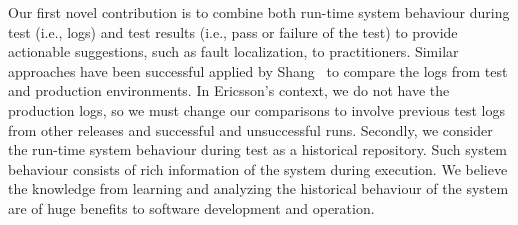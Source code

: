 Our first novel contribution is to combine both run-time system behaviour during test (i.e., logs) and test results (i.e., pass or failure of the test) to provide actionable suggestions, such as fault localization, to practitioners. Similar approaches have been successful applied by Shang~\cite{Shang:2013:ADB:2486788.2486842} to compare the logs from test and production environments. In Ericsson's context, we do not have the production logs, so we must change our comparisons to involve previous test logs from other releases and successful and unsuccessful runs. Secondly, we consider the run-time system behaviour during test as a historical repository. Such system behaviour consists of rich information of the system during execution. We believe the knowledge from learning and analyzing the historical behaviour of the system are of huge benefits to software development and operation.

